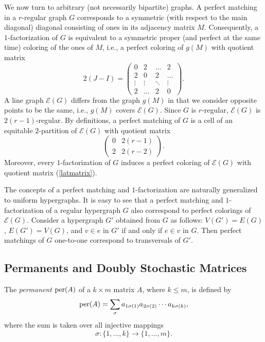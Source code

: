 \documentclass[11pt]{article}
\theoremstyle{definition}
\newcommand{\per}{{\rm per}}
\begin{document}
{{{We now turn to arbitrary (not necessarily bipartite) graphs.
A perfect matching in a $r$-regular graph $G$ corresponds to a symmetric
(with respect to the main diagonal)  diagonal consisting of ones in its adjacency
matrix $M$.
Consequently, a $1$-factorization of $G$ is equivalent to a symmetric
proper (and perfect at the same time) coloring of the ones of $M$, i.e., a perfect coloring of $g(M)$ with quotient matrix 
\begin{equation}\label{latmatrix}
2(J-I)=
\left(
\begin{array}{cccc}
0&2&\dots&2\\
2&0&2&\dots\\
\vdots&\vdots&\ddots&\vdots\\
2&\dots&2&0
\end{array}
\right).
\end{equation}
 A line graph $\mathcal{E}(G)$ differs from the graph  $g(M)$ in that we consider opposite points to be the same, i.e.,  $g(M)$ covers $\mathcal{E}(G)$. 
Since $G$ is $r$-regular, $\mathcal{E}(G)$ is
$2(r-1)$-regular.
By definitions, a perfect matching of $G$ is a cell of an equitable $2$-partition of  $\mathcal{E}(G)$ with quotient matrix 
\[
\left(
\begin{array}{cc}
0&2(r-1)\\
2&2(r-2)
\end{array}
\right).
\]
Moreover, every $1$-factorization of $G$ induces a perfect coloring of $\mathcal{E}(G)$ with quotient matrix (\ref{latmatrix}).



The concepts of a perfect matching and $1$-factorization  are naturally generalized to uniform hypergraphs. 
It is easy to see that a perfect matching and  $1$-factorization of a regular hypergraph  $G$ also correspond to perfect colorings of $\mathcal{E}(G)$. Consider a hypergraph $G'$ obtained from $G$ as follows: $V(G')=E(G)$, $E(G')=V(G)$, and $v\in e$ in $G'$ if and only if  $e\in v$ in $G$.
Then perfect matchings of $G$ one-to-one correspond to transversals of $G'$.



\subsection{Permanents and Doubly Stochastic Matrices}

The {\sl permanent} $\per(A)$ of a $k\times m$ matrix
$A$, where $k\le m$, is defined by
\[
\per(A)=
\sum_{\sigma}
a_{1\sigma(1)}a_{2\sigma(2)}\cdots a_{k\sigma(k)},
\]
where the sum is taken over all injective mappings
\[
\sigma:\{1,\ldots,k\}\rightarrow\{1,\ldots,m\}.
\]

}}}
\end{document}
